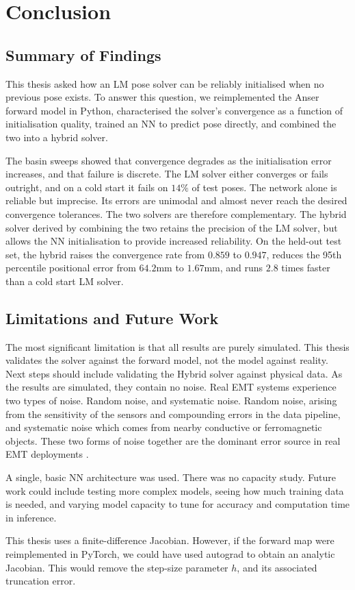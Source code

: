 \chapter{Conclusion}\label{chap:conclusion}

\section{Summary of Findings}

This thesis asked how an LM pose solver can be reliably initialised when no previous pose exists. To answer this question, we reimplemented the Anser forward model in Python, characterised the solver's convergence as a function of initialisation quality, trained an NN to predict pose directly, and combined the two into a hybrid solver. 

The basin sweeps showed that convergence degrades as the initialisation error increases, and that failure is discrete. The LM solver either converges or fails outright, and on a cold start it fails on $14\%$ of test poses. The network alone is reliable but imprecise. Its errors are unimodal and almost never reach the desired convergence tolerances. The two solvers are therefore complementary. The hybrid solver derived by combining the two retains the precision of the LM solver, but allows the NN initialisation to provide increased reliability. On the held-out test set, the hybrid raises the convergence rate from $0.859$ to $0.947$, reduces the 95th percentile positional error from $64.2$mm to $1.67$mm, and runs $2.8$ times faster than a cold start LM solver.



\section{Limitations and Future Work}

The most significant limitation is that all results are purely simulated. This thesis validates the solver against the forward model, not the model against reality. Next steps should include validating the Hybrid solver against physical data. As the results are simulated, they contain no noise. Real EMT systems experience two types of noise. Random noise, and systematic noise. Random noise, arising from the sensitivity of the sensors and compounding errors in the data pipeline, and systematic noise which comes from nearby conductive or ferromagnetic objects. These two forms of noise together are the dominant error source in real EMT deployments \cite{sorriento2020}. 

A single, basic NN architecture was used. There was no capacity study. Future work could include testing more complex models, seeing how much training data is needed, and varying model capacity to tune for accuracy and computation time in inference.

This thesis uses a finite-difference Jacobian. However, if the forward map were reimplemented in PyTorch, we could have used autograd to obtain an analytic Jacobian. This would remove the step-size parameter $h$, and its associated truncation error.
